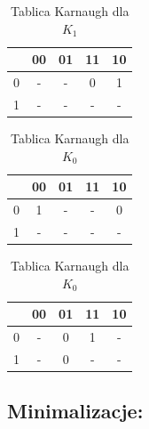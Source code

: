 \documentclass[12pt,a4paper]{article}
\begin{document}
\begin{table}[!ht]
\begin{minipage}{.5\textwidth}
			 		\vspace{0.4cm}
			 		
			 		\caption{Tablica Karnaugh dla $K_1$}
			 		\vspace{0.2cm}
			 		\centering
			 		\begin{tabular}{c|c|c|c|c}
			 			\backslashbox{$Q_2$}{$Q_1Q_0$}&00&01&11&10\\\hline
			 			0&	-&-&0&1\\\hline
			 			1&	-&-&-&-\\
			 		\end{tabular} 
				\end{minipage}
				 
			\end{table}
			
			\FloatBarrier
			
			\begin{table}[!ht]
				
				\begin{minipage}{.5\textwidth}
					
					\caption{Tablica Karnaugh dla $J_0$}
					\vspace{0.2cm}
					\centering
					\begin{tabular}{c|c|c|c|c}
						\backslashbox{$Q_2$}{$Q_1Q_0$}&00&01&11&10\\\hline
						0&	1&-&-&0\\\hline
						1&	-&-&-&-\\
					\end{tabular}
				\end{minipage}%
				\begin{minipage}{.5\textwidth}
					
					\caption{Tablica Karnaugh dla $K_0$}
					\vspace{0.2cm}
					\centering
					\begin{tabular}{c|c|c|c|c}
						\backslashbox{$Q_2$}{$Q_1Q_0$}&00&01&11&10\\\hline
						0&	-&0&1&-\\\hline
						1&	-&0&-&-\\
					\end{tabular} 
				\end{minipage}
					
			\end{table}
				
		\subsection{Minimalizacje:}
		
\end{document}
